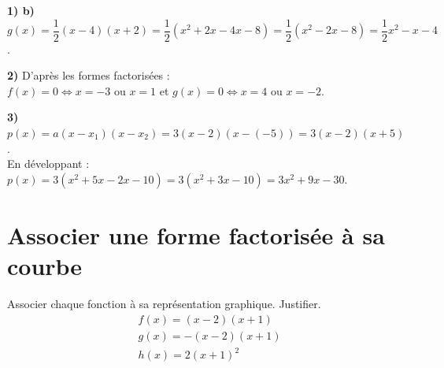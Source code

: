 \documentclass[11pt,a4paper]{book}
\begin{document}
\medskip
\begin{corrBox}
	\textbf{1) b)} $g(x)=\dfrac12(x-4)(x+2)=\dfrac12\left(x^2+2x-4x-8\right)=\dfrac12\left(x^2-2x-8\right)=\dfrac12x^2-x-4$.
\end{corrBox}

\medskip
\begin{corrBox}
	\textbf{2)} D'après les formes factorisées :\\
	$f(x)=0 \iff x=-3$ ou $x=1$ \qquad et \qquad $g(x)=0 \iff x=4$ ou $x=-2$.
\end{corrBox}

\medskip
\begin{corrBox}
	\textbf{3)} $p(x)=a(x-x_1)(x-x_2)=3(x-2)(x-(-5))=3(x-2)(x+5)$.\\
	En développant : $p(x)=3\left(x^2+5x-2x-10\right)=3\left(x^2+3x-10\right)=3x^2+9x-30$.
\end{corrBox}

\section*{\color{green!55!black}Associer une forme factorisée à sa courbe}

\exerciceDS{}

\begin{minipage}[c]{0.40\linewidth}
	Associer chaque fonction à sa représentation graphique. Justifier.
	$$
	\begin{aligned}
		& f(x)=(x-2)(x+1) \\
		& g(x)=-(x-2)(x+1) \\
		& h(x)=2(x+1)^{2}
	\end{aligned}
	$$
\end{minipage} \hfill
\begin{minipage}[c]{0.56\linewidth}
	\begin{center}
	\end{center}
\end{minipage}
\end{document}
